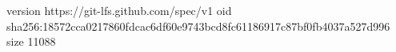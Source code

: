 version https://git-lfs.github.com/spec/v1
oid sha256:18572cca0217860fdcac6df60e9743bcd8fc61186917c87bf0fb4037a527d996
size 11088
